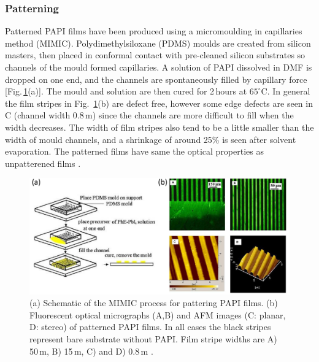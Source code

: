 \subsubsection{Patterning}
Patterned PAPI films have been produced using a micromoulding in capillaries method (MIMIC). Polydimethylsiloxane (PDMS) moulds are created from silicon masters, then placed in conformal contact with pre-cleaned silicon substrates so channels of the mould formed capillaries. A solution of PAPI dissolved in DMF is dropped on one end, and the channels are spontaneously filled by capillary force [Fig.\,\ref{2Fig11}(a)]. The mould and solution are then cured for 2\,hours at $65^{\circ}$C. In general the film stripes in Fig.\ \ref{2Fig11}(b) are defect free, however some edge defects are seen in C (channel width 0.8\,\textmu m) since the channels are more difficult to fill when the width decreases. The width of film stripes also tend to be a little smaller than the width of mould channels, and a shrinkage of around 25\% is seen after solvent evaporation.  The patterned films have same the optical properties as unpatterened films \cite{Cheng2003}.
\begin{figure} [h!]
\centering
\includegraphics[width=\textwidth]{Fig11}
\caption{(a) Schematic of the MIMIC process for pattering PAPI films. (b) Fluorescent optical micrographs (A,B) and AFM images (C: planar, D: stereo) of patterned PAPI films. In all cases the black stripes represent bare substrate without PAPI. Film stripe widths are A) 50\,\textmu m, B) 15\,\textmu m, C) and D) 0.8\,\textmu m \cite{Cheng2003}.}
\label{2Fig11}
\end{figure}


